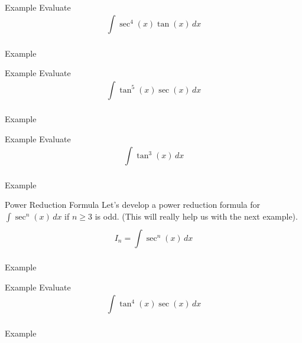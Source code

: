 \documentclass[presentation]{beamer}
\begin{document}
\begin{frame}[label={sec:orgabb6146}]{Example}
Evaluate
\[
\int\limits_{}^{} \sec^4(x)\tan(x)\,dx \]
\vspace{10in}
\end{frame}

\begin{frame}[label={sec:org5e3202f}]{Example}
\end{frame}

\begin{frame}[label={sec:org74b18d6}]{Example}
Evaluate
\[
\int\limits_{}^{} \tan^5(x)\sec(x)\,dx \]
\vspace{10in}
\end{frame}

\begin{frame}[label={sec:org5881662}]{Example}
\end{frame}

\begin{frame}[label={sec:org106f301}]{Example}
Evaluate
\[
\int\limits_{}^{} \tan^3 (x)\,dx \]
\vspace{10in}
\end{frame}

\begin{frame}[label={sec:org05177c7}]{Example}
\end{frame}

\begin{frame}[label={sec:orgbc39f8a}]{Power Reduction Formula}
Let's develop a power reduction formula for \(\int\limits_{}^{} \sec^n(x)\,dx\) if \(n\ge 3\) is odd. (This will really help us with the next example).
\[
I_n = \int\limits_{}^{} \sec^n(x)\,dx\]
\vspace{10in}
\end{frame}

\begin{frame}[label={sec:org9740fa9}]{Example}
\end{frame}

\begin{frame}[label={sec:orge3023bd}]{Example}
Evaluate
\[
\int\limits_{}^{} \tan^4(x)\sec(x)\,dx\]
\vspace{10in}
\end{frame}

\begin{frame}[label={sec:orge04f28e}]{Example}
\end{frame}
\end{document}
